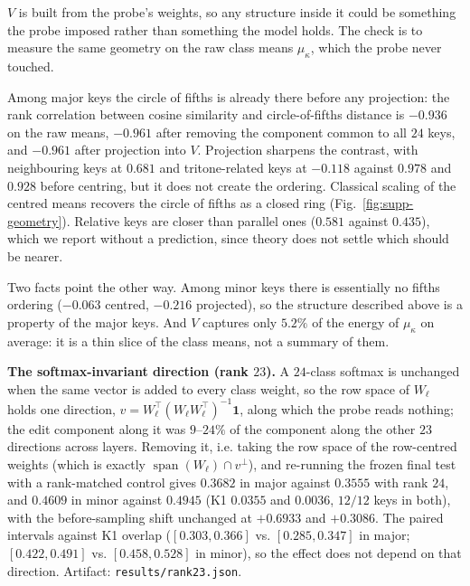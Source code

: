 \documentclass{article}
\begin{document}
$V$ is built from the probe's weights, so any structure inside it could be something the
probe imposed rather than something the model holds. The check is to measure the same
geometry on the raw class means $\mu_\kappa$, which the probe never touched.

Among major keys the circle of fifths is already there before any projection: the rank
correlation between cosine similarity and circle-of-fifths distance is $-0.936$ on the raw
means, $-0.961$ after removing the component common to all $24$ keys, and $-0.961$ after
projection into $V$. Projection sharpens the contrast, with neighbouring keys at $0.681$
and tritone-related keys at $-0.118$ against $0.978$ and $0.928$ before centring, but
it does not create the ordering. Classical scaling of the centred means recovers the
circle of fifths as a closed ring (Fig.~\ref{fig:supp-geometry}). Relative keys are closer
than parallel ones ($0.581$ against $0.435$), which we report without a prediction, since
theory does not settle which should be nearer.

Two facts point the other way. Among minor keys there is
essentially no fifths ordering ($-0.063$ centred, $-0.216$ projected), so the structure
described above is a property of the major keys. And $V$ captures only $5.2\%$ of the
energy of $\mu_\kappa$ on average: it is a thin slice of the class means, not a summary of
them.

\textbf{The softmax-invariant direction (rank $23$).} A $24$-class softmax is unchanged
when the same vector is added to every class weight, so the row space of $W_\ell$ holds
one direction, $v = W_\ell^{\top}(W_\ell W_\ell^{\top})^{-1}\mathbf{1}$, along which the
probe reads nothing; the edit component along it was $9$--$24\%$ of the component along
the other $23$ directions across layers. Removing it, i.e. taking the row space of the
row-centred weights (which is exactly $\operatorname{span}(W_\ell)\cap v^{\perp}$), and
re-running the frozen final test with a rank-matched control gives $0.3682$ in major
against $0.3555$ with rank $24$, and $0.4609$ in minor against $0.4945$ (K1 $0.0355$ and
$0.0036$, $12/12$ keys in both), with the before-sampling shift unchanged at
$+0.6933$ and $+0.3086$. The paired intervals against K1 overlap ($[0.303,0.366]$ vs.
$[0.285,0.347]$ in major; $[0.422,0.491]$ vs. $[0.458,0.528]$ in minor), so the effect
does not depend on that direction. Artifact: \texttt{results/rank23.json}.
\end{document}
